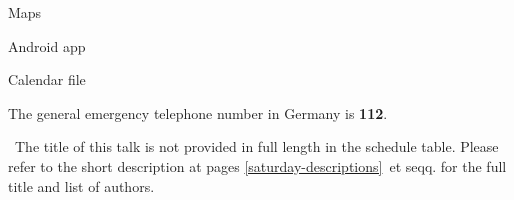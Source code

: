 \vspace*{\contentspace}%
\noindent Maps \dotfill \pageref{public-transport-map}

\enlargethispage{1\baselineskip}
\vfill
\begin{minipage}[t]{0.47\linewidth}
  \begin{center}
    Android app

  \end{center}
\end{minipage}
\hfill
\begin{minipage}[t]{0.47\linewidth}
  \begin{center}
    Calendar file

  \end{center}
\end{minipage}

\noindent
The general emergency telephone number in Germany is \textbf{112}.

\small{
\noindent
  \diamondSymbol\ The title of this talk is not provided in full length in the schedule table. Please refer to the short description at pages \ref{saturday-descriptions}~et seqq. for the full title and list of authors.
}\normalsize


\newpage
